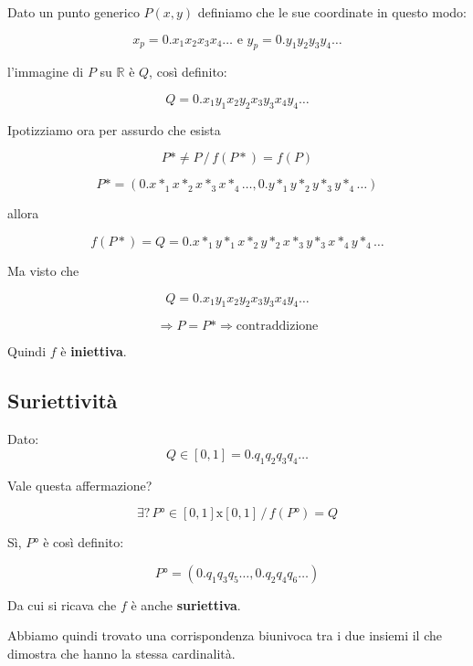 \documentclass[../dimostrazioni]{subfiles}
\begin{document}
            Dato un punto generico \(P (x,y) \) definiamo che le sue coordinate in questo modo:
            
            \[  x_p = 0.x_1 x_2 x_3 x_4 \dots \, \, \text{e} \, \, y_p = 0.y_1 y_2 y_3 y_ 4 \dots \]
            
            l'immagine di \(P\) su \( \mathbb{R} \) è \( Q \), così definito:
            
            \[   Q = 0.x_1 y_1 x_2 y_2 x_3 y_3 x_4 y_ 4 \dots    \]
            
            Ipotizziamo ora per assurdo che esista 
            
            \[    P* \neq P \, / \, f(P*) = f(P) \]

            \[    P* = (0.x*_1 x*_2 x*_3 x*_4 \dots , 0.y*_1 y*_2 y*_3 y*_4 \dots) \]
            
            allora
            
            \[    f(P*) = Q = 0.x*_1 y*_1 x*_2 y*_2 x*_3 y*_3 x*_4 y*_4 \dots \]
            
            Ma visto che
            
            \[    Q = 0.x_1 y_1 x_2 y_2 x_3 y_3 x_4 y_ 4 \dots \]
            
            \[    \Rightarrow P = P* \Rightarrow \text{contraddizione}   \]
            
            Quindi \(f\) è \textbf{iniettiva}.

            \subsection*{Suriettività}

            Dato:
            \[    Q \in [0,1] = 0.q_1 q_2 q_3 q_4 \dots    \]

            Vale questa affermazione?
            
            \[    \exists \text{?} \, P° \in [0,1]\text{x}[0,1] \, / \, f(P°) = Q    \]

            Sì, \(P°\) è così definito:
            
            \[    P° = (0.q_1 q_3 q_5 \dots, 0.q_2 q_4 q_6 \dots)    \]

            Da cui si ricava che \(f\) è anche \textbf{suriettiva}.

            Abbiamo quindi trovato una corrispondenza biunivoca tra i due insiemi il che dimostra che hanno la stessa cardinalità.
            
\end{document}
